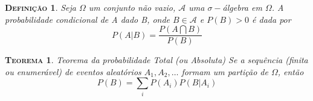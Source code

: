 \documentclass[
	12pt,				%
    oneside,			%
	a4paper,			%
	english,			%
	french,				%
	spanish,			%
	brazil,				%
	]{abntex2}
\newtheorem{theorem}{\scshape Teorema}[section]
\newtheorem{definicao}{\scshape Defini\c{c}\~ao}[section]
\begin{document}
        \begin{definicao}
            Seja $\Omega$ um conjunto não vazio, $\mathcal{A}$ uma $\sigma-$álgebra em $\Omega$. A probabilidade condicional de A dado B, onde $B\in\mathcal{A}$ e $P(B) > 0$ é dada por
            \begin{equation*}
                P(A|B) = \frac{P(A\bigcap B)}{P(B)}
            \end{equation*}
        \end{definicao}

        \begin{theorem}{Teorema da probabilidade Total (ou Absoluta)}
            Se a sequência (finita ou enumerável) de eventos aleatórios $A_1,A_2,\dots$ formam um partição de $\Omega$, então
            \begin{equation*}
                P(B) = \sum_{i}P(A_i)P(B|A_i)
            \end{equation*}
        \end{theorem}
\end{document}

